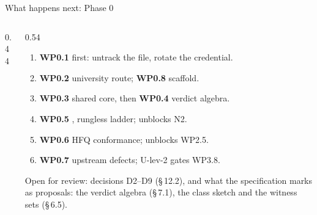 \documentclass[aspectratio=169,11pt]{beamer}
\newcommand{\vl}[1]{\texttt{\detokenize{#1}}}
\begin{document}
\begin{frame}{What happens next: Phase 0}
\begin{columns}[T]
\begin{column}{0.44\textwidth}
\centering
{}
\end{column}
\begin{column}{0.54\textwidth}
\footnotesize
\begin{enumerate}\setlength\itemsep{1pt}
  \item \textbf{WP0.1} first: untrack the file, rotate the credential.
  \item \textbf{WP0.2} university route; \textbf{WP0.8} scaffold.
  \item \textbf{WP0.3} shared core, then \textbf{WP0.4} verdict algebra.
  \item \textbf{WP0.5} \vl{subfloor}, rungless ladder; unblocks N2.
  \item \textbf{WP0.6} HFQ conformance; unblocks WP2.5.
  \item \textbf{WP0.7} upstream defects; U-lev-2 gates WP3.8.
\end{enumerate}
\par\medskip
\scriptsize
Open for review: decisions D2--D9 (\S\,12.2), and what the specification marks as proposals:
the verdict algebra (\S\,7.1), the class sketch and the witness sets (\S\,6.5).
\end{column}
\end{columns}
\end{frame}
\end{document}
